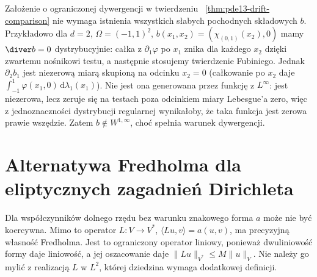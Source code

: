 \begin{uwaga}
Założenie o ograniczonej dywergencji w twierdzeniu
~\ref{thm:pde13-drift-comparison} nie wymaga istnienia
wszystkich słabych pochodnych składowych $b$.
Przykładowo dla $d=2$, $\Omega=(-1,1)^2$,
$b(x_1,x_2)=(\chi_{(0,1)}(x_2),0)$ mamy
$\diver b=0$ dystrybucyjnie: całka z $\partial_1\varphi$
po $x_1$ znika dla każdego $x_2$ dzięki zwartemu nośnikowi
testu, a następnie stosujemy twierdzenie Fubiniego.
Jednak $\partial_2b_1$ jest niezerową miarą skupioną
na odcinku $x_2=0$ (całkowanie po $x_2$ daje
$\int_{-1}^1\varphi(x_1,0)\,\mathrm d\lambda_1(x_1)$).
Nie jest ona generowana przez funkcję z $L^\infty$:
jest niezerowa, lecz zeruje się na testach poza odcinkiem
miary Lebesgue'a zero, więc z jednoznaczności dystrybucji
regularnej wynikałoby, że taka funkcja jest zerowa
prawie wszędzie. Zatem $b\notin W^{1,\infty}$, choć
spełnia warunek dywergencji.
\end{uwaga}



\section{Alternatywa Fredholma dla eliptycznych zagadnień Dirichleta}
\label{sec:pde13-fredholm}
Dla współczynników dolnego rzędu bez warunku znakowego forma $a$
może nie być koercywna. Mimo to operator $L:V\to V^*$,
$\langle Lu,v\rangle=a(u,v)$, ma precyzyjną własność Fredholma.
Jest to ograniczony operator liniowy, ponieważ dwuliniowość
formy daje liniowość, a jej oszacowanie daje
$\|Lu\|_{V^*}\le M\|u\|_V$.
Nie należy go mylić z realizacją $L$ w $L^2$, której dziedzina
wymaga dodatkowej definicji.


